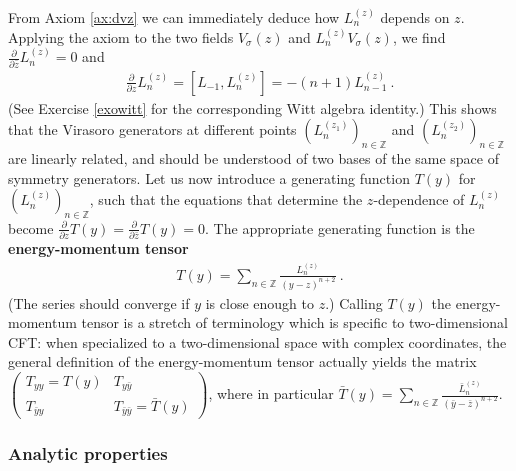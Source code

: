 \documentclass[12pt, a4paper, notitlepage, twoside]{report}
\numberwithin{equation}{section}
\theoremstyle{break}
\begin{document}
From Axiom \ref{ax:dvz} we can immediately deduce how $L_n^{(z)}$ depends on $z$. Applying the axiom to the two fields $V_\sigma(z)$ and $L_n^{(z)}V_\sigma(z)$, we find $\frac{\partial}{\partial \bar z} L_n^{(z)}=0$ and 
\begin{align}
 \frac{\partial}{\partial z} L_n^{(z)} = [L_{-1},L_n^{(z)}] = -(n+1)L_{n-1}^{(z)}\ .
 \label{pll}
\end{align}
(See Exercise \ref{exowitt} for the corresponding Witt algebra identity.)
This shows that the Virasoro generators at different points $(L_n^{(z_1)})_{n\in \mathbb{Z}}$ and $(L_n^{(z_2)})_{n\in \mathbb{Z}}$ are linearly related, and should be understood of two bases of the same space of symmetry generators. Let us now introduce  a generating function $T(y)$ for $(L_n^{(z)})_{n\in\mathbb{Z}}$, such that the equations that determine the $z$-dependence of $L_n^{(z)}$ become $\frac{\partial}{\partial z} T(y) = \frac{\partial}{\partial \bar z} T(y) = 0$. The appropriate generating function is the \textbf{\boldmath energy-momentum tensor}
\begin{align}
 \boxed{T(y) = \sum_{n\in{\mathbb{Z}}} \frac{L_n^{(z)}}{(y-z)^{n+2}}}\ .
\label{tsl}
\end{align}
(The series should converge if $y$ is close enough to $z$.) Calling $T(y)$ the energy-momentum tensor is a stretch of terminology which is specific to two-dimensional CFT: when specialized to a two-dimensional space with complex coordinates, the general definition of the energy-momentum tensor actually yields the matrix 
$\left(\begin{smallmatrix} T_{yy} = T(y) & T_{y\bar y} \\ T_{\bar y y} & T_{\bar y \bar y} = \bar T(y) \end{smallmatrix}\right)$, where in particular $\bar T(y)= \sum_{n\in{\mathbb{Z}}} \frac{\bar L_n^{(z)}}{(\bar y-\bar z)^{n+2}}$. 

\subsubsection{Analytic properties}
\end{document}
